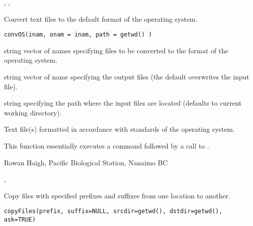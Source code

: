 \documentclass[letterpaper]{book}
\begin{document}
%
\begin{SeeAlso}\relax
 , ,  
\end{SeeAlso}
%
\begin{Description}\relax
Convert text files to the default format of the operating system.
\end{Description}
%
\begin{Usage}
\begin{verbatim}
convOS(inam, onam = inam, path = getwd() )
\end{verbatim}
\end{Usage}
%
\begin{Arguments}
\begin{ldescription}
\item[\code{inam}] string vector of names specifying files to be converted to the format of the operating system.
\item[\code{onam}] string vector of name specifying the output files (the default overwrites the input file).
\item[\code{path}] string specifying the path where the input files are located (defaults to current working directory).
\end{ldescription}
\end{Arguments}
%
\begin{Value}
Text file(s) formatted in accordance with standards of the operating system.
\end{Value}
%
\begin{Note}\relax
This function essentially executes a  command followed by a call to .
\end{Note}
%
\begin{Author}\relax
Rowan Haigh, Pacific Biological Station, Nanaimo BC
\end{Author}
%
\begin{SeeAlso}\relax
{}, 
\end{SeeAlso}
%
\begin{Description}\relax
Copy files with specified prefixes and suffixes from one location to another.
\end{Description}
%
\begin{Usage}
\begin{verbatim}
copyFiles(prefix, suffix=NULL, srcdir=getwd(), dstdir=getwd(), ask=TRUE)
\end{verbatim}
\end{Usage}
\end{document}

